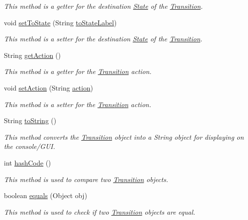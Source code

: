 \begin{DoxyCompactItemize}
\begin{DoxyCompactList}\small\item\em This method is a getter for the destination \hyperlink{classmdp_1_1core_1_1_state}{State} of the \hyperlink{classmdp_1_1core_1_1_transition}{Transition}. \end{DoxyCompactList}\item 
void \hyperlink{classmdp_1_1core_1_1_transition_a33f909b166d36a9b648df8ee1f3c8abd}{set\+To\+State} (String \hyperlink{classmdp_1_1core_1_1_transition_ac820d803424e51b25a3a6c895b94a33a}{to\+State\+Label})
\begin{DoxyCompactList}\small\item\em This method is a setter for the destination \hyperlink{classmdp_1_1core_1_1_state}{State} of the \hyperlink{classmdp_1_1core_1_1_transition}{Transition}. \end{DoxyCompactList}\item 
String \hyperlink{classmdp_1_1core_1_1_transition_aa326dda42cf7a74864153108cebf410e}{get\+Action} ()
\begin{DoxyCompactList}\small\item\em This method is a getter for the \hyperlink{classmdp_1_1core_1_1_transition}{Transition} action. \end{DoxyCompactList}\item 
void \hyperlink{classmdp_1_1core_1_1_transition_a1113b616a2d05a3d7c79764a55c385b9}{set\+Action} (String \hyperlink{classmdp_1_1core_1_1_transition_ab7b1be5b4717075dfd6e40d62d2a25ca}{action})
\begin{DoxyCompactList}\small\item\em This method is a setter for the \hyperlink{classmdp_1_1core_1_1_transition}{Transition} action. \end{DoxyCompactList}\item 
String \hyperlink{classmdp_1_1core_1_1_transition_a57da45810cd71407a3b388659e25fa67}{to\+String} ()
\begin{DoxyCompactList}\small\item\em This method converts the \hyperlink{classmdp_1_1core_1_1_transition}{Transition} object into a String object for displaying on the console/\+G\+U\+I. \end{DoxyCompactList}\item 
int \hyperlink{classmdp_1_1core_1_1_transition_a95eb3f4db22b6269d24a423929b4b45b}{hash\+Code} ()
\begin{DoxyCompactList}\small\item\em This method is used to compare two \hyperlink{classmdp_1_1core_1_1_transition}{Transition} objects. \end{DoxyCompactList}\item 
boolean \hyperlink{classmdp_1_1core_1_1_transition_a2786cc2a671657f9c1b51c4f01e6be6e}{equals} (Object obj)
\begin{DoxyCompactList}\small\item\em This method is used to check if two \hyperlink{classmdp_1_1core_1_1_transition}{Transition} objects are equal. \end{DoxyCompactList}\end{DoxyCompactItemize}
